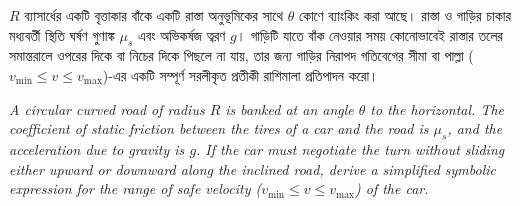 \documentclass[12pt, a4paper]{article}
\begin{document}
\begin{tcolorbox}[questionbox={প্রশ্ন (Question) 12}]
\noindent
$R$ ব্যাসার্ধের একটি বৃত্তাকার বাঁকে একটি রাস্তা অনুভূমিকের সাথে $\theta$ কোণে ব্যাংকিং করা আছে। রাস্তা ও গাড়ির চাকার মধ্যবর্তী স্থিতি ঘর্ষণ গুণাঙ্ক $\mu_s$ এবং অভিকর্ষজ ত্বরণ $g$। গাড়িটি যাতে বাঁক নেওয়ার সময় কোনোভাবেই রাস্তার তলের সমান্তরালে ওপরের দিকে বা নিচের দিকে পিছলে না যায়, তার জন্য গাড়ির নিরাপদ গতিবেগের সীমা বা পাল্লা ($v_{\text{min}} \le v \le v_{\text{max}}$)-এর একটি সম্পূর্ণ সরলীকৃত প্রতীকী রাশিমালা প্রতিপাদন করো।

\vspace{0.8em}
\begin{english}
\noindent\textit{\color{darkgray}
A circular curved road of radius $R$ is banked at an angle $\theta$ to the horizontal. The coefficient of static friction between the tires of a car and the road is $\mu_s$, and the acceleration due to gravity is $g$. If the car must negotiate the turn without sliding either upward or downward along the inclined road, derive a simplified symbolic expression for the range of safe velocity ($v_{\text{min}} \le v \le v_{\text{max}}$) of the car.
}
\end{english}
\end{tcolorbox}


\vspace{1.5em}
\begin{center}
\end{center}
\vspace{1em}
\end{document}
